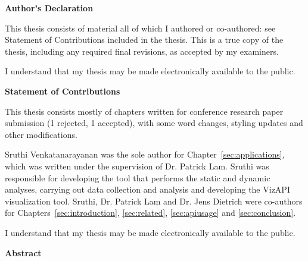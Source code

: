 \cleardoublepage %

\begin{center}\textbf{Author's Declaration}\end{center}
  \noindent
This thesis consists of material all of which I authored or co-authored: see Statement of Contributions included in the thesis. This is a true copy of the thesis, including any required final revisions, as accepted by my examiners.

  \bigskip
  
  \noindent
I understand that my thesis may be made electronically available to the public.

\cleardoublepage

\begin{center}\textbf{Statement of Contributions}\end{center}
   \noindent
This thesis consists mostly of chapters written for conference research paper submission
(1 rejected, 1 accepted), with some word changes, styling updates and other modifications.

Sruthi Venkatanarayanan was the sole author for Chapter~\ref{sec:applications}, which was written under the
supervision of Dr. Patrick Lam. Sruthi was responsible for developing the tool that performs the static and dynamic analyses, 
carrying out data collection and analysis and developing the VizAPI visualization tool.
Sruthi, Dr. Patrick Lam and Dr. Jens Dietrich were co-authors for Chapters~\ref{sec:introduction}, \ref{sec:related}, \ref{sec:apiusage} and \ref{sec:conclusion}.
  \bigskip
  
  \noindent
I understand that my thesis may be made electronically available to the public.

\cleardoublepage



\begin{center}\textbf{Abstract}\end{center}


